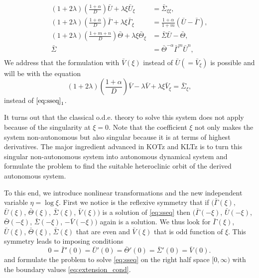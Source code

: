 \documentclass[a4paper,11pt]{article}
\def\bG{{\bar{\Gamma}}}
\def\bV{{\bar{V}}}
\def\bTh{{\bar{\Theta}}}
\def\bS{{\bar{\Sigma}}}
\def\bU{{\bar{U}}}
\theoremstyle{remark}
\begin{document}
\begin{equation}\label{eq:sseq}
\begin{aligned}
 (1+2 \lambda) \left(\frac{1 + \alpha}{D}\right) \bU + \lambda \xi \bU_\xi &= \bS_{\xi\xi},\\
 (1+2 \lambda) \left(\frac{1 + \alpha}{D}\right) \bG + \lambda \xi \bG_\xi&=\frac{1+ \alpha}{1+m}(\bU - \bG),\\
 (1+2 \lambda) \left(\frac{1 + m+n}{D}\right) \bTh + \lambda \xi \bTh_\xi&=\bS\bU - \bTh,\\
 \bS &= \bTh^ {- \alpha} \bG ^m \bU ^n,\\
\end{aligned}
\end{equation}
We address that the formulation with $\bV(\xi)$ instead of $\bU(=\bV_\xi)$ is possible and will be with the equation
$$ (1+2 \lambda) \left(\frac{1 + \alpha}{D}\right) \bV - \lambda \bV + \lambda \xi \bV_\xi=\bS_\xi,$$
instead of $\eqref{eq:sseq}_1$.

It turns out that the classical o.d.e. theory to solve this system does not apply because of the singularity at $\xi=0$. Note that the coefficient $\xi$ not only makes the system non-autonomous but also singular because it is at terms of highest derivatives. The major ingredient advanced in KOTz and KLTz is to turn this singular non-autonomous system into autonomous dynamical system and formulate the problem to find the suitable heteroclinic orbit of the derived autonomous system.

To this end, we introduce nonlinear transformations and the new independent variable $\eta = \log\xi$. First we notice is the reflexive symmetry that if $\big(\bG(\xi)$, $\bU(\xi)$, $\bTh(\xi)$, $\bS(\xi)$, $\bV(\xi)\big)$ is a solution of \eqref{eq:sseq} then $\big(\bG(-\xi)$, $\bU(-\xi)$, $\bTh(-\xi)$, $\bS(-\xi)$, $-\bV(-\xi)\big)$ again is a solution. We thus look for $\bG(\xi)$, $\bU(\xi)$, $\bTh(\xi)$, $\bS(\xi)$ that are even and $\bV(\xi)$ that is odd function of $\xi$. This symmetry leads to imposing conditions
\begin{equation} \label{eq:extension_cond}
 0=\bG'(0)=\bU'(0)=\bTh'(0)=\bS'(0)=\bV(0).
\end{equation}
and formulate the problem to solve \eqref{eq:sseq} on the right half space $[0,\infty)$ with the boundary values \eqref{eq:extension_cond}. 
\end{document}
